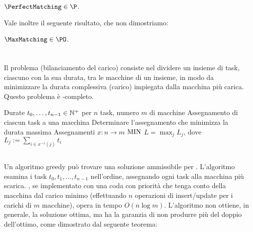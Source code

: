 \begin{corollario}
	$\PerfectMatching\in\P$.
\end{corollario}

Vale inoltre il seguente risultato, che non dimostriamo:
\begin{theorem}
	$\MaxMatching\in\PO$.
\end{theorem}



\section{\LoadBalancing}
Il problema \LoadBalancing (bilanciamento del carico) consiste nel dividere un insieme di task, ciascuno con la sua durata, tra le macchine di un insieme, in modo da minimizzare la durata complessiva (carico) impiegata dalla macchina più carica. Questo problema è \NPO-completo.

\popt
{\LoadBalancing}
{Durate $t_0,\dots,t_{n-1}\in\mathbb N^+$ per $n$ task, numero $m$ di macchine}
{Assegnamento di ciascun task a una macchina}
{Determinare l'assegnamento che minimizza la durata massima}
{Assegnamenti $x:n\to m$}
{$\mathrm{MIN}$}
{$L=\max_j L_j$, dove $L_j:=\sum_{i\in x^{-1}(j)} t_i$}


\subsection{\GreedyLoadBalancing}
Un algoritmo greedy può trovare una soluzione ammissibile per \LoadBalancing.
L'algoritmo esamina i task $t_0,t_1,\dots,t_{n-1}$ nell'ordine, assegnando ogni task alla macchina più scarica.
\GreedyLoadBalancing, se implementato con una coda con priorità che tenga conto della macchina dal carico minimo (effettuando $n$ operazioni di insert/update per i carichi di $m$ macchine), opera in tempo $O(n\log m)$.
L'algoritmo non ottiene, in generale, la soluzione ottima, ma ha la garanzia di non produrre più del doppio dell'ottimo, come dimostrato dal seguente teorema:

